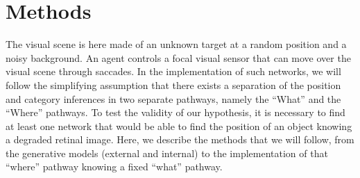 \section{Methods}
The visual scene is here made of an unknown target at a random position and a noisy background. An agent controls a focal visual sensor that can move over the visual scene through saccades. In the implementation of such networks, we will follow the simplifying assumption that there exists a separation of the position and category inferences in two separate pathways, namely the ``What'' and the ``Where'' pathways. To test the validity of our hypothesis, it is necessary to find at least one network that would be able to find the position of an object knowing a degraded retinal image. Here, we describe the methods that we will follow, from the generative models (external and internal) to the implementation  of that ``where'' pathway knowing a fixed ``what'' pathway. %
